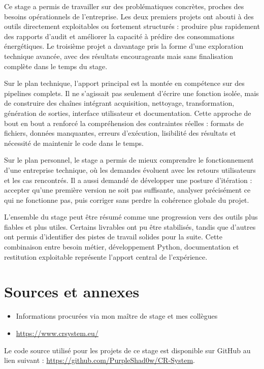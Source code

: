 \documentclass[12pt]{article}
\begin{document}
Ce stage a permis de travailler sur des problématiques concrètes, proches des besoins opérationnels de l’entreprise. Les deux premiers projets ont abouti à des outils directement exploitables ou fortement structurés : produire plus rapidement des rapports d’audit et améliorer la capacité à prédire des consommations énergétiques. Le troisième projet a davantage pris la forme d’une exploration technique avancée, avec des résultats encourageants mais sans finalisation complète dans le temps du stage. 

Sur le plan technique, l’apport principal est la montée en compétence sur des pipelines complets. Il ne s’agissait pas seulement d’écrire une fonction isolée, mais de construire des chaînes intégrant acquisition, nettoyage, transformation, génération de sorties, interface utilisateur et documentation. Cette approche de bout en bout a renforcé la compréhension des contraintes réelles : formats de fichiers, données manquantes, erreurs d’exécution, lisibilité des résultats et nécessité de maintenir le code dans le temps. 

Sur le plan personnel, le stage a permis de mieux comprendre le fonctionnement d’une entreprise technique, où les demandes évoluent avec les retours utilisateurs et les cas rencontrés. Il a aussi demandé de développer une posture d’itération : accepter qu’une première version ne soit pas suffisante, analyser précisément ce qui ne fonctionne pas, puis corriger sans perdre la cohérence globale du projet. 

L’ensemble du stage peut être résumé comme une progression vers des outils plus fiables et plus utiles. Certains livrables ont pu être stabilisés, tandis que d’autres ont permis d’identifier des pistes de travail solides pour la suite. Cette combinaison entre besoin métier, développement Python, documentation et restitution exploitable représente l’apport central de l’expérience. 

\section{Sources et annexes}

\begin{itemize}
    \item Informations procurées via mon maître de stage et mes collègues
    \item \url{https://www.crsystem.eu/}
\end{itemize}

Le code source utilisé pour les projets de ce stage est disponible sur GitHub au lien suivant : \url{https://github.com/PurpleShad0w/CR-System}.
\end{document}
